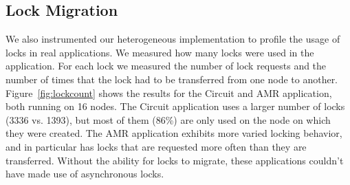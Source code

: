 
\subsection{Lock Migration}
\label{subsec:lockmig}

We also instrumented our heterogeneous implementation to profile the usage of 
locks in real applications.  We measured how many locks were used in the application.  For
each lock we measured the number of lock requests and the number of times that the lock
had to be transferred from one node to another.  Figure~\ref{fig:lockcount} shows the results 
for the Circuit and AMR application, both running on 16 nodes.  The Circuit application uses
a larger number of locks (3336 vs. 1393), but most of them (86\%) are only used on the node on 
which they were created.  The AMR application exhibits more varied locking behavior, and in 
particular has locks that are requested more often than they are transferred.  Without the
ability for locks to migrate, these applications couldn't have made use of asynchronous
locks.

